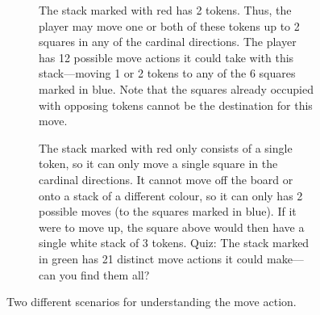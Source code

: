 \documentclass[]{article}
\newcommand{\white}[3] {
    \foreach \x in {1,...,#3}
        \node[draw,thick,minimum size=17,fill=black!30,circle]
            at ({.5+#1},{\x*.1+.4+#2}) {};
    \node[draw,thick,minimum size=17,fill=white,circle]
        at ({.5+#1},{#3*.1+.5+#2}) {};
    \node[]
        at ({.5+#1},{#3*.1+.5+#2}) {\large #3};
}
\newcommand{\black}[3] {
    \foreach \x in {1,...,#3}
        \node[draw,thick,minimum size=15,fill=black!60,rounded corners=0.6mm]
            at ({.5+#1},{\x*.1+.4+#2}) {};
    \node[draw,thick,minimum size=15,fill=black!30,rounded corners=0.6mm]
        at ({.5+#1},{#3*.1+.5+#2}) {};
    \node[]
        at ({.5+#1},{#3*.1+.5+#2}) {\large #3};
}
\newcommand{\colorSquare}[3] {
  \draw[fill=#1] ({#2},{#3}) rectangle ({#2+1},{#3+1});
}
\newcommand{\board} {
    \tikzset{
        x=0.8cm,
        y=0.8cm,
    }
    \draw[fill=black!5,very thick] (0, 0) rectangle (8, 8);
    \draw[step=1] (0, 0) grid (8, 8);
}
\begin{document}
\begin{figure}[ht!]
\centering
\begin{subfigure}{.45\textwidth}
    \centering
    \caption{\label{fig:move-1}
        The stack marked with red has 2 tokens.
        Thus, the player may move one or both of these tokens
        up to 2 squares in any of the cardinal directions.
        The player has 12 possible move actions it could take with
        this stack---moving 1 or 2 tokens to any of the 6 squares marked in
        blue.
        Note that the squares already occupied with opposing tokens cannot be
        the destination for this move.
    }
\end{subfigure}
\begin{subfigure}{.01\textwidth}
\phantom{SP}
\end{subfigure}
\begin{subfigure}{.51\textwidth}
    \centering
    \caption{\label{fig:move-2}
        The stack marked with red only consists of a single token, so it
        can only move a single square in the cardinal directions.
        It cannot move off the board or onto a stack of a different colour,
        so it can only has 2 possible moves (to the squares marked in blue).
        If it were to move up, the square above would then have a single
        white stack of 3 tokens.
        Quiz: The stack marked in green has 21 distinct move actions it
        could make---can you find them all?
    }
\end{subfigure}
\caption{\label{fig:moves}
    Two different scenarios for understanding the move action.
}
\end{figure}
\end{document}
